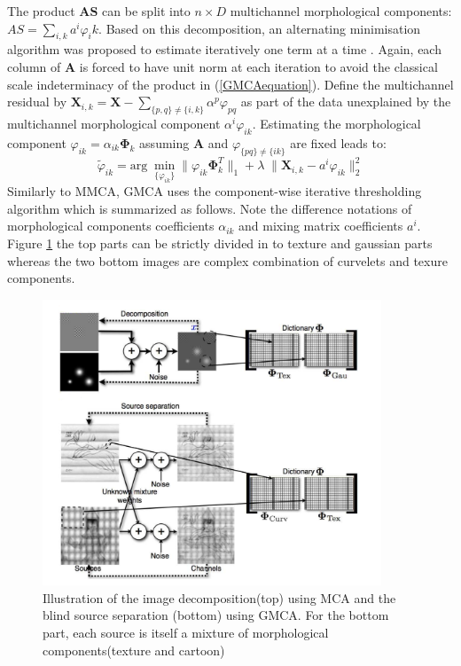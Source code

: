 The product $\mathbf{AS}$ can be split into $n\times D$ multichannel morphological components: $AS = \sum_{i,k}a^i\varphi_ik$. Based on this decomposition, an alternating minimisation algorithm was proposed to estimate iteratively one term at a time \cite{BobinJ_2007SaMD}. Again, each column of $\mathbf{A}$ is forced to have unit norm at each iteration to avoid the classical scale indeterminacy of the product in (\ref{GMCAequation}). Define the multichannel residual by $\mathbf{X}_{i,k} = \mathbf{X} - \sum_{\{p,q\}\neq \{i,k\}} \alpha^p \varphi_{pq}$ as part of the data unexplained by the multichannel morphological component $\alpha^i \varphi_{ik}$. Estimating the morphological component $\varphi_{ik} = \alpha_{ik}\mathbf{\Phi}_k$ assuming $\mathbf{A}$ and $\varphi_{\{pq\} \neq \{ik\}}$ are fixed leads to: 
\begin{equation}
    \tilde{\varphi}_{ik} = \text{arg} \; \min_{\{\varphi_{ik}\}} \lVert \varphi_{ik}\mathbf{\Phi}_k^T\rVert_{1} + \lambda \; \lVert \mathbf{X}_{i,k} - a^i\varphi_{ik}\rVert_2^2
\end{equation}
Similarly to MMCA, GMCA uses the component-wise iterative thresholding algorithm which is summarized as follows. Note the difference notations of morphological components coefficients $\alpha_{ik}$ and mixing matrix coefficients $a^i$.\\

Figure \ref{illu_mca_and_gmca} the top parts can be strictly divided in to texture and gaussian parts whereas the two bottom images are complex combination of curvelets and texure components.

\begin{figure}[!htbp]
\centering
\includegraphics[width=0.9\textwidth]{images/mca_gmca.png}
\caption{Illustration of the image decomposition(top) using MCA and the blind source separation (bottom) using GMCA. For the bottom part, each source is itself a mixture of morphological components(texture and cartoon)}
\label{illu_mca_and_gmca}
\end{figure}

